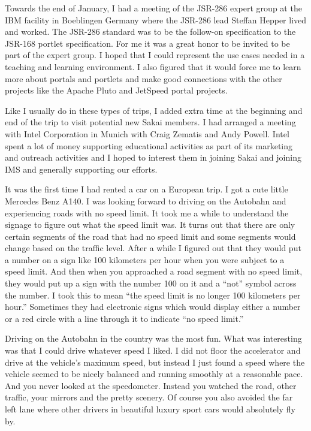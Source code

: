 \documentclass[12pt]{book}
\begin{document}
Towards the end of January, I had a meeting of the JSR-286
expert group at the IBM facility in Boeblingen Germany
where the JSR-286 lead Steffan Hepper lived and worked.
The JSR-286 standard was to be the follow-on specification
to the JSR-168 portlet specification.  For me it was a great honor
to be invited to be part of the expert group.   I hoped
that I could represent the use cases needed in a teaching
and learning environment.  I also figured that it would force me
to learn more about portals and portlets and make good
connections with the other projects like the Apache Pluto and
JetSpeed portal projects.

Like I usually do in these types of trips, I added extra
time at the beginning and end of the trip to visit potential
new Sakai members. I had arranged a meeting with Intel Corporation
in Munich with Craig Zematis and Andy Powell.  Intel spent a lot
of money supporting educational activities as part of
its marketing and outreach activities and I hoped to interest them
in joining Sakai and joining IMS and generally supporting our
efforts.

It was the first time I had rented a car on a European trip.  I
got a cute little Mercedes Benz A140.   I was looking forward to
driving on the Autobahn and experiencing roads with
no speed limit.  It took me a while to understand the signage
to figure out what the speed limit was.  It turns out that there
are only certain segments of the road that had no speed limit
and some segments would change based on the traffic level.  After
a while I figured out that they would put a number on a sign
like 100 kilometers per hour when you were subject to a speed limit.
And then when you approached a road segment with no speed limit,
they would put up a sign with the number 100 on it and a ``not''
symbol across the number.   I took this to mean ``the speed limit
is no longer 100 kilometers per hour.''  Sometimes they had electronic signs
which would display either a number or a red circle with a line through
it to indicate ``no speed limit.''

Driving on the Autobahn in the country was the most fun.
What was interesting was that I could drive whatever speed
I liked.  I did not floor the accelerator and drive at the vehicle's
maximum speed, but instead I just found a speed where the vehicle seemed
to be nicely balanced and running smoothly at a reasonable pace.
And you never looked at the speedometer.  Instead you watched the road,
other traffic, your mirrors and the pretty scenery.
Of course you also avoided
the far left lane where other drivers in beautiful luxury sport
cars would absolutely fly by.
\end{document}
